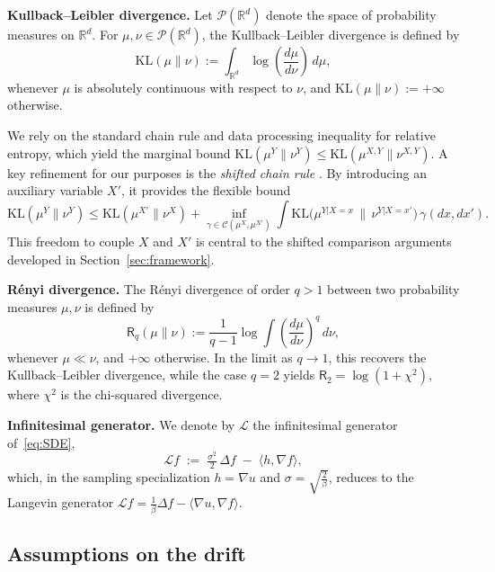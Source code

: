 \documentclass[11pt,a4paper,reqno]{amsart}
\theoremstyle{plain}
\theoremstyle{definition}
\theoremstyle{remark}
\newcommand{\R}{\mathbb{R}}
\newcommand{\KL}{\mathrm{KL}}
\begin{document}
\medskip
\noindent\textbf{Kullback--Leibler divergence.}
Let $\mathcal{P}(\R^d)$ denote the space of probability measures on $\R^d$.
For $\mu,\nu\in\mathcal{P}(\R^d)$, the Kullback--Leibler divergence is defined by
\begin{equation}\label{eq:kl-def}
 \KL(\mu\|\nu)
 :=
 \int_{\R^d} \log\!\left(\frac{d\mu}{d\nu}\right)\,d\mu,
\end{equation}
whenever $\mu$ is absolutely continuous with respect to $\nu$, and $\KL(\mu\|\nu):=+\infty$ otherwise.

\medskip
\noindent
We rely on the standard chain rule and data processing inequality for relative entropy, which yield the marginal bound \(\KL(\mu^Y\|\nu^Y) \le \KL(\mu^{X,Y}\|\nu^{X,Y})\). A key refinement for our purposes is the \emph{shifted chain rule} \cite{chewi2024local}. By introducing an auxiliary variable \(X'\), it provides the flexible bound
\begin{equation}\label{eq:shifted-chain-rule}
 \KL(\mu^Y\|\nu^Y)
 \le
 \KL(\mu^{X'}\|\nu^X)
 +
 \inf_{\gamma\in\mathcal{C}(\mu^X,\mu^{X'})}
 \int
 \KL\!\bigl(\mu^{Y|X=x}\,\big\|\,\nu^{Y|X=x'}\bigr)\,\gamma(dx,dx').
\end{equation}
This freedom to couple \(X\) and \(X'\) is central to the shifted comparison arguments developed in Section~\ref{sec:framework}.


\medskip
\noindent\textbf{Rényi divergence.}
The Rényi divergence of order $q > 1$ between two probability measures $\mu,\nu$ is defined by
\begin{equation}\label{eq:renyi-def}
 \mathsf{R}_q(\mu\|\nu)
 :=
 \frac{1}{q-1} \log \int \left(\frac{d\mu}{d\nu}\right)^q\,d\nu,
\end{equation}
whenever $\mu \ll \nu$, and $+\infty$ otherwise. In the limit as $q \to 1$, this recovers the Kullback--Leibler divergence, while the case $q=2$ yields $\mathsf{R}_2 = \log(1 + \chi^2)$, where $\chi^2$ is the chi-squared divergence.



\medskip
\noindent\textbf{Infinitesimal generator.}
We denote by $\mathcal{L}$ the infinitesimal generator of~\eqref{eq:SDE},
\[
  \mathcal{L}f \;:=\; \tfrac{\sigma^{2}}{2}\,\Delta f \;-\; \langle h,\nabla f\rangle,
\]
which, in the sampling specialization $h =\nabla u$ and $\sigma =\sqrt{\frac{2}{\beta}}$, reduces to the Langevin generator $\mathcal{L}f = \tfrac{1}{\beta}\Delta f - \langle \nabla u,\nabla f\rangle$.




\subsection{Assumptions on the drift}
\label{subsec:assumptions}
\end{document}
